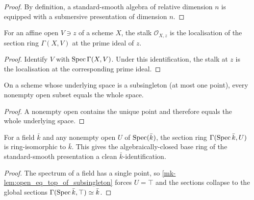 \begin{proof}
  By definition, a standard-smooth algebra of relative dimension \(n\)
  is equipped with a submersive presentation of dimension \(n\).
\end{proof}

\begin{lemma}\label{mk-lem:isLocalization_atPrime_stalk_of_affineOpen}
  \leanok

  For an affine open \(V \ni z\) of a scheme \(X\), the stalk \(\mathcal O_{X,z}\) is
  the localisation of the section ring \(\Gamma(X, V)\) at the prime ideal of \(z\).
\end{lemma}

\begin{proof}
  Identify \(V\) with \(\operatorname{Spec}\Gamma(X,V)\).  Under this identification,
  the stalk at \(z\) is the localisation at the corresponding prime ideal.
\end{proof}

\begin{lemma}\label{mk-lem:open_eq_top_of_subsingleton}
  \leanok

  On a scheme whose underlying space is a subsingleton (at most one point), every
  nonempty open subset equals the whole space.
\end{lemma}

\begin{proof}
  A nonempty open contains the unique point and therefore equals the
  whole underlying space.
\end{proof}

\begin{lemma}\label{mk-lem:gammaSpecField_ringEquiv}
  \leanok

  For a field \(\bar k\) and any nonempty open \(U\) of \(\operatorname{Spec}(\bar k)\), the section
  ring \(\Gamma(\operatorname{Spec} \bar k, U)\) is ring-isomorphic to \(\bar k\). This gives the
  algebraically-closed base ring of the standard-smooth presentation a clean
  \(\bar k\)-identification.
\end{lemma}

\begin{proof}
  The spectrum of a field has a single point, so
  \ref{mk-lem:open_eq_top_of_subsingleton} forces \(U = \top\) and the sections collapse
  to the global sections \(\Gamma(\operatorname{Spec} \bar k, \top) \simeq \bar k\).
\end{proof}

